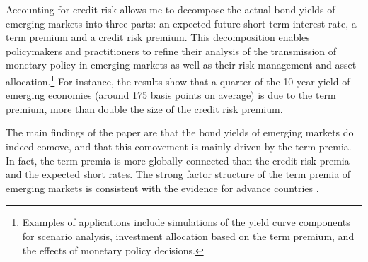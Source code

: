 {Accounting for credit risk allows me to decompose the actual bond yields of emerging markets into three parts: an expected future short-term interest rate, a term premium and a credit risk premium. 
This decomposition enables policymakers and practitioners to refine their analysis of the transmission of monetary policy in emerging markets as well as their risk management and asset allocation.\footnote{ Examples of applications include simulations of the yield curve components for scenario analysis, investment allocation based on the term premium, and the effects of monetary policy decisions.}
For instance, the results show that a quarter of the 10-year yield of emerging economies (around 175 basis points on average) is due to the term premium, more than double the size of the credit risk premium. 


The main findings of the paper are that the bond yields of emerging markets do indeed comove, and that this comovement is mainly driven by the term premia. 
In fact, the term premia is more globally connected than the credit risk premia and the expected short rates. The strong factor structure of the term premia of emerging markets is consistent with the evidence for advance countries \citep*{ACDM:2019}.

}
